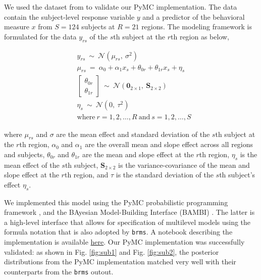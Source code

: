 \documentclass[../main.tex]{subfiles}
\begin{document}
We used the dataset from \textcite{chenHandlingMultiplicityNeuroimaging2019} to validate our PyMC implementation. The data contain the subject-level response variable $y$ and a predictor of the behavioral measure $x$ from $S=124$ subjects at $R=21$ regions. The modeling framework is formulated for the data $y_{rs}$ of the $s$th subject at the $r$th region as below,

\begin{equation}\label{eq:bml}
    \begin{split}
	&y_{rs}~\sim~\mathcal{N}(\mu_{rs},~\sigma^2) \\
	&\mu_{rs}~=~\alpha_0+\alpha_1 x_s + \theta_{0r}+\theta_{1r} x_s +\eta_s\\
	&\!\!\begin{bmatrix}
	\theta_{0r} \\
	\theta_{1r} 
	\end{bmatrix}~\sim~\mathcal{N}(\boldsymbol{0}_{2\times 1},~\boldsymbol{S}_{2\times 2}) \\
	&\eta_{s}~\sim~\mathcal{N}(0,~\tau^2) \\
	&\text{where}~r=1,2,\ldots,R~\text{and}~s=1,2,\ldots,S
    \end{split}
\end{equation}

where $\mu_{rs}$ and $\sigma$ are the mean effect and standard deviation of the $s$th subject at the $r$th region, $\alpha_0$ and $\alpha_1$ are the overall mean and slope effect across all regions and subjects, $\theta_{0r}$ and $\theta_{1r}$ are the mean and slope effect at the $r$th region, $\eta_s$ is the mean effect of the $s$th subject, $\boldsymbol{S}_{2\times 2}$ is the variance-covariance of the mean and slope effect at the $r$th region, and $\tau$ is the standard deviation of the $s$th subject's effect $\eta_s$.%

We implemented this model using the PyMC probabilistic programming framework  \parencite{Salvatier2016}, and the BAyesian Model-Building Interface (BAMBI)  \parencite{capretto2020}. The latter is a high-level interface that allows for specification of multilevel models using the formula notation that is also adopted by \texttt{brms}. A notebook describing the implementation is available \href{https://github.com/crnolan/pyrba}{here}. Our PyMC implementation was successfully validated: as shown in Fig. \ref{fig:sub1} and Fig. \ref{fig:sub2},  the posterior distributions from the PyMC implementation matched very well with their counterparts from the \texttt{brms} outout.%
\end{document}
